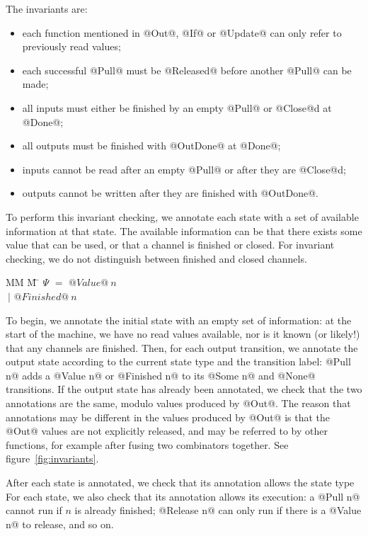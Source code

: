 The invariants are:
\begin{itemize}
\item each function mentioned in @Out@, @If@ or @Update@ can only refer to previously read values;
\item each successful @Pull@ must be @Released@ before another @Pull@ can be made;
\item all inputs must either be finished by an empty @Pull@ or @Close@d at @Done@;
\item all outputs must be finished with @OutDone@ at @Done@;
\item inputs cannot be read after an empty @Pull@ or after they are @Close@d;
\item outputs cannot be written after they are finished with @OutDone@.
\end{itemize}

To perform this invariant checking, we annotate each state with a set of available information at that state.
The available information can be that there exists some value that can be used, or that a channel is finished or closed.
For invariant checking, we do not distinguish between finished and closed channels.

\begin{tabbing}
MM \= M \= \kill
$\Psi$ \> $=$  \> $@Value@~n$ \\
       \> $~|$ \> $@Finished@~n$ \\
\end{tabbing}

To begin, we annotate the initial state with an empty set of information: at the start of the machine, we have no read values available, nor is it known (or likely!) that any channels are finished.
Then, for each output transition, we annotate the output state according to the current state type and the transition label: @Pull n@ adds a @Value n@ or @Finished n@ to its @Some n@ and @None@ transitions.
If the output state has already been annotated, we check that the two annotations are the same, modulo values produced by @Out@.
The reason that annotations may be different in the values produced by @Out@ is that the @Out@ values are not explicitly released, and may be referred to by other functions, for example after fusing two combinators together.
See figure~\ref{fig:invariants}.



After each state is annotated, we check that its annotation allows the state type 
For each state, we also check that its annotation allows its execution: a @Pull n@ cannot run if $n$ is already finished; @Release n@ can only run if there is a @Value n@ to release, and so on.


